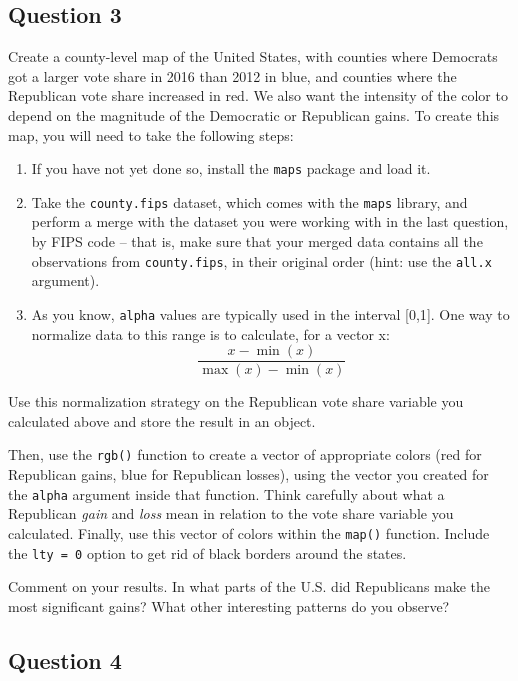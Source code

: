 \documentclass[]{article}
\begin{document}
\subsection{Question 3}\label{question-3}

Create a county-level map of the United States, with counties where
Democrats got a larger vote share in 2016 than 2012 in blue, and
counties where the Republican vote share increased in red. We also want
the intensity of the color to depend on the magnitude of the Democratic
or Republican gains. To create this map, you will need to take the
following steps:

\begin{enumerate}
\def\labelenumi{\arabic{enumi}.}
\item
  If you have not yet done so, install the \texttt{maps} package and
  load it.
\item
  Take the \texttt{county.fips} dataset, which comes with the
  \texttt{maps} library, and perform a merge with the dataset you were
  working with in the last question, by FIPS code -- that is, make sure
  that your merged data contains all the observations from
  \texttt{county.fips}, in their original order (hint: use the
  \texttt{all.x} argument).
\item
  As you know, \texttt{alpha} values are typically used in the interval
  {[}0,1{]}. One way to normalize data to this range is to calculate,
  for a vector x: \[\frac{x - \min(x)}{\max(x) - \min(x)}\]
\end{enumerate}

Use this normalization strategy on the Republican vote share variable
you calculated above and store the result in an object.

Then, use the \texttt{rgb()} function to create a vector of appropriate
colors (red for Republican gains, blue for Republican losses), using the
vector you created for the \texttt{alpha} argument inside that function.
Think carefully about what a Republican \emph{gain} and \emph{loss} mean
in relation to the vote share variable you calculated. Finally, use this
vector of colors within the \texttt{map()} function. Include the
\texttt{lty = 0} option to get rid of black borders around the states.

Comment on your results. In what parts of the U.S. did Republicans make
the most significant gains? What other interesting patterns do you
observe?

\subsection{Question 4}\label{question-4}
\end{document}

